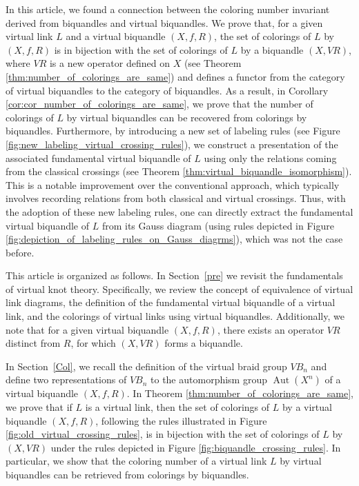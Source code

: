 \documentclass[11pt, reqno]{amsart}
\theoremstyle{definition}
\newcommand{\Aut}{\operatorname{Aut}}
\begin{document}
 In this article, we found a connection between the coloring number invariant derived from biquandles and virtual biquandles. We prove that, for a given virtual link $L$ and a virtual biquandle $(X,f,R)$, the set of colorings of $L$ by $(X,f,R)$ is in bijection with the set of colorings of $L$ by a biquandle $(X,VR)$, where $VR$ is a new operator defined on $X$ (see Theorem \ref{thm:number_of_colorings_are_same}) and defines a functor from the category of virtual biquandles to the category of biquandles. As a result, in Corollary \ref{cor:cor_number_of_colorings_are_same}, we prove that the number of colorings of $L$ by virtual biquandles can be recovered from colorings by biquandles. Furthermore, by introducing a new set of labeling rules (see Figure \ref{fig:new_labeling_virtual_crossing_rules}), we construct a presentation of the associated fundamental virtual biquandle of $L$ using only the relations coming from the classical crossings (see Theorem \ref{thm:virtual_biquandle_isomorphism}). This is a notable improvement over the conventional approach, which typically involves recording relations from both classical and virtual crossings. Thus, with the adoption of these new labeling rules, one can directly extract the fundamental virtual biquandle of $L$ from its Gauss diagram (using rules depicted in Figure \ref{fig:depiction_of_labeling_rules_on_Gauss_diagrms}), which was not the case before.

This article is organized as follows.  In Section~\ref{pre} we revisit the fundamentals of virtual knot theory. Specifically, we review the concept of equivalence of virtual link diagrams,  the definition of the fundamental virtual biquandle of a virtual link, and the colorings of virtual links using virtual biquandles. Additionally, we note that for a given virtual biquandle $(X,f,R)$, there exists an operator $VR$ distinct from $R$, for which $(X,VR)$ forms a biquandle.

In Section~\ref{Col}, we recall the definition of the virtual braid group $VB_n$ and define two representations of $VB_n$ to the automorphism group $\Aut(X^n)$  of a virtual biquandle $(X, f, R)$. In Theorem \ref{thm:number_of_colorings_are_same}, we prove that if $L$ is a virtual link, then the set of colorings of $L$ by a virtual biquandle $(X,f,R)$, following the rules illustrated in Figure \ref{fig:old_virtual_crossing_rules}, is in bijection with the set of colorings of $L$ by $(X,VR)$ under the rules depicted in Figure \ref{fig:biquandle_crossing_rules}. In particular, we show that the coloring number of a virtual link  $L$ by virtual biquandles can be retrieved from colorings by biquandles.
\end{document}
